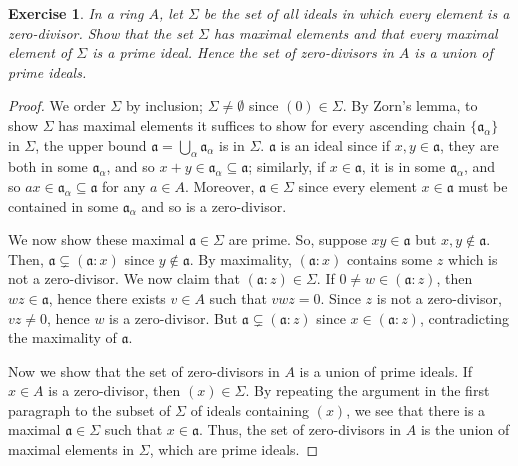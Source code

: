 \documentclass[12pt,letterpaper]{article}
\newtheorem{problem}{Exercise}[section]
\theoremstyle{definition}
\theoremstyle{remark}
\numberwithin{figure}{problem}
\numberwithin{equation}{section}
\begin{document}
\begin{problem}
  In a ring
  $A$, let
  $\Sigma$ be the set of all ideals in which every element is a zero-divisor.
  Show that the set
  $\Sigma$ has maximal elements and that every maximal element of
  $\Sigma$ is a prime ideal.
  Hence the set of zero-divisors in
  $A$ is a union of prime ideals.
\end{problem}
\begin{proof}
  We order
  $\Sigma$ by inclusion;
  $\Sigma \ne
  \emptyset$ since
  $(0) \in
  \Sigma$.
  By Zorn's lemma, to show
  $\Sigma$ has maximal elements it suffices to show for every ascending chain
  $\{\mathfrak{a}_\alpha\}$ in
  $\Sigma$, the upper bound
  $\mathfrak{a} = \bigcup_\alpha
  \mathfrak{a}_\alpha$ is in
  $\Sigma$.
  $\mathfrak{a}$ is an ideal since if
  $x,y \in
  \mathfrak{a}$, they are both in some
  $\mathfrak{a}_\alpha$, and so
  $x+y \in \mathfrak{a}_\alpha \subseteq
  \mathfrak{a}$; similarly, if
  $x \in
  \mathfrak{a}$, it is in some
  $\mathfrak{a}_\alpha$, and so
  $ax \in \mathfrak{a}_\alpha \subseteq
  \mathfrak{a}$ for any
  $a \in
  A$.
  Moreover,
  $\mathfrak{a} \in
  \Sigma$ since every element
  $x \in
  \mathfrak{a}$ must be contained in some
  $\mathfrak{a}_\alpha$ and so is a zero-divisor.
  \par We now show these maximal
  $\mathfrak{a} \in
  \Sigma$ are prime.
  So, suppose
  $xy \in
  \mathfrak{a}$ but
  $x,y \notin
  \mathfrak{a}$.
  Then,
  $\mathfrak{a} \subsetneq (\mathfrak{a} :
  x)$ since
  $y \notin
  \mathfrak{a}$.
  By maximality,
  $(\mathfrak{a} :
  x)$ contains some
  $z$ which is not a zero-divisor.
  We now claim that
  $(\mathfrak{a} : z) \in
  \Sigma$.
  If
  $0 \ne w \in (\mathfrak{a} :
  z)$, then
  $wz \in
  \mathfrak{a}$, hence there exists
  $v \in
  A$ such that
  $vwz =
  0$.
  Since
  $z$ is not a zero-divisor,
  $vz \ne
  0$, hence
  $w$ is a zero-divisor.
  But
  $\mathfrak{a} \subsetneq (\mathfrak{a} :
  z)$ since
  $x \in (\mathfrak{a} :
  z)$, contradicting the maximality of
  $\mathfrak{a}$.
  \par Now we show that the set of zero-divisors in
  $A$ is a union of prime ideals.
  If
  $x \in
  A$ is a zero-divisor, then
  $(x) \in
  \Sigma$.
  By repeating the argument in the first paragraph to the subset of
  $\Sigma$ of ideals containing
  $(x)$, we see that there is a maximal
  $\mathfrak{a} \in
  \Sigma$ such that
  $x \in
  \mathfrak{a}$.
  Thus, the set of zero-divisors in
  $A$ is the union of maximal elements in
  $\Sigma$, which are prime ideals.
\end{proof}
\end{document}
